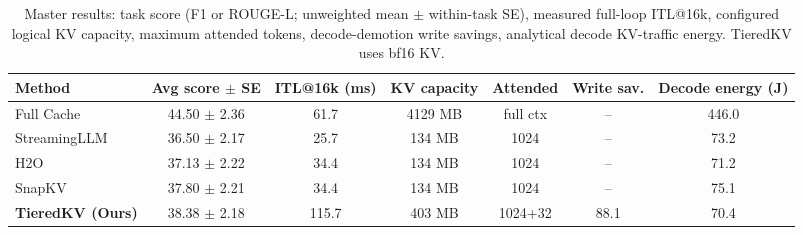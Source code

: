 \begin{table}[t]
\centering
\small
\setlength{\tabcolsep}{4pt}
\caption{Master results: task score (F1 or ROUGE-L; unweighted mean $\pm$ within-task SE), measured full-loop ITL@16k, configured logical KV capacity, maximum attended tokens, decode-demotion write savings, analytical decode KV-traffic energy. TieredKV uses bf16 KV.}
\label{tab:master}
\begin{tabular}{lcccccc}
\toprule
\textbf{Method} & \textbf{Avg score $\pm$ SE} & \textbf{ITL@16k (ms)} & \textbf{KV capacity} & \textbf{Attended} & \textbf{Write sav.} & \textbf{Decode energy (J)} \\
\midrule
Full Cache & 44.50 $\pm$ 2.36 & 61.7 & 4129 MB & full ctx & -- & 446.0 \\
StreamingLLM & 36.50 $\pm$ 2.17 & 25.7 & 134 MB & 1024 & -- & 73.2 \\
H2O & 37.13 $\pm$ 2.22 & 34.4 & 134 MB & 1024 & -- & 71.2 \\
SnapKV & 37.80 $\pm$ 2.21 & 34.4 & 134 MB & 1024 & -- & 75.1 \\
\textbf{TieredKV (Ours)} & 38.38 $\pm$ 2.18 & 115.7 & 403 MB & 1024+32 & 88.1 & 70.4 \\
\bottomrule
\end{tabular}
\end{table}
